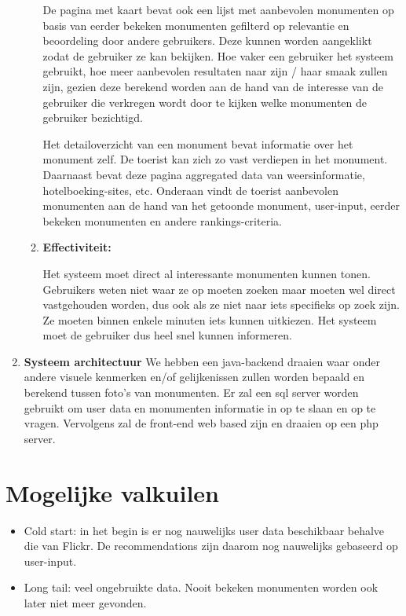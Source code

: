 \documentclass{article}
\begin{document}
\begin{enumerate}
\begin{enumerate}
		De pagina met kaart bevat ook een lijst met aanbevolen monumenten op basis van eerder bekeken monumenten gefilterd op relevantie en beoordeling door andere gebruikers. Deze kunnen worden aangeklikt zodat de gebruiker ze kan bekijken. Hoe vaker een gebruiker het systeem gebruikt, hoe meer aanbevolen resultaten naar zijn / haar smaak zullen zijn, gezien deze berekend worden aan de hand van de interesse van de gebruiker die verkregen wordt door te kijken welke monumenten de gebruiker bezichtigd.
		
		Het detailoverzicht van een monument bevat informatie over het monument zelf. De toerist kan zich zo vast verdiepen in het monument. Daarnaast bevat deze pagina aggregated data van weersinformatie, hotelboeking-sites, etc. Onderaan vindt de toerist aanbevolen monumenten aan de hand van het getoonde monument, user-input, eerder bekeken monumenten en andere rankings-criteria.
		
		\item{\textbf{Effectiviteit:}}
		
		Het systeem moet direct al interessante monumenten kunnen tonen. Gebruikers weten niet waar ze op moeten zoeken maar moeten wel direct vastgehouden worden, dus ook als ze niet naar iets specifieks op zoek zijn. Ze moeten binnen enkele minuten iets kunnen uitkiezen. Het systeem moet de gebruiker dus heel snel kunnen informeren.
	\end{enumerate}
	\item{\textbf{Systeem architectuur}}
We hebben een java-backend draaien waar onder andere visuele kenmerken en/of gelijkenissen zullen worden bepaald en berekend tussen foto's van monumenten. Er zal een sql server worden gebruikt om user data en monumenten informatie in op te slaan en op te vragen. Vervolgens zal de front-end web based zijn en draaien op een php server.
	
\end{enumerate}
\section{Mogelijke valkuilen}
\begin{itemize}
\item Cold start: in het begin is er nog nauwelijks user data beschikbaar behalve die van Flickr. De recommendations zijn daarom nog nauwelijks gebaseerd op user-input.
\item Long tail: veel ongebruikte data. Nooit bekeken monumenten worden ook later niet meer gevonden.
\end{itemize}
\end{document}
